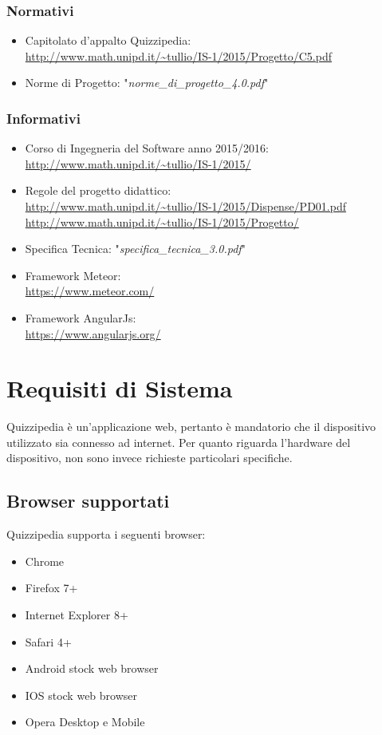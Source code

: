 \documentclass[a4paper,11pt]{article}
\begin{document}
		\subsubsection{Normativi}

		\begin{itemize}
			\item Capitolato d'appalto Quizzipedia:\\
			\url{http://www.math.unipd.it/~tullio/IS-1/2015/Progetto/C5.pdf}
			\item Norme di Progetto: "\textit{norme\_di\_progetto\_4.0.pdf}"
		\end{itemize}
		\subsubsection{Informativi}
		\begin{itemize}
			\item Corso di Ingegneria del Software anno 2015/2016:\\
			\url{http://www.math.unipd.it/~tullio/IS-1/2015/}
			\item Regole del progetto didattico:\\
			\url{http://www.math.unipd.it/~tullio/IS-1/2015/Dispense/PD01.pdf}\\
			\url{http://www.math.unipd.it/~tullio/IS-1/2015/Progetto/}
			\item Specifica Tecnica: "\textit{specifica\_tecnica\_3.0.pdf}"
			\item Framework Meteor:\\
			\url{https://www.meteor.com/}
			\item Framework AngularJs:\\
			\url{https://www.angularjs.org/}
		\end{itemize}
	\pagebreak
	\newpage
\section{Requisiti di Sistema}
Quizzipedia è un'applicazione web, pertanto è mandatorio che il dispositivo utilizzato sia connesso ad internet. Per quanto riguarda l'hardware del dispositivo, non sono invece richieste particolari specifiche.
\subsection{Browser supportati}
Quizzipedia supporta i seguenti browser:
\begin{itemize}
	\item Chrome
	\item Firefox 7+
	\item Internet Explorer 8+
	\item Safari 4+
	\item Android stock web browser
	\item IOS stock web browser
	\item Opera Desktop e Mobile
\end{itemize}
	\newpage
\end{document}
